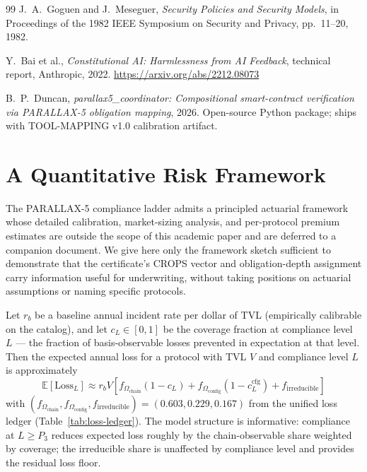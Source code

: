 \documentclass[11pt,a4paper]{article}
\begin{document}
\begin{thebibliography}{99}
J.~A.\ Goguen and J.~Meseguer,
\emph{Security Policies and Security Models}, in Proceedings of the 1982 IEEE Symposium on Security and Privacy, pp.~11--20, 1982.

Y.~Bai et al.,
\emph{Constitutional AI: Harmlessness from AI Feedback}, technical report, Anthropic, 2022.
\url{https://arxiv.org/abs/2212.08073}


B.~P.\ Duncan,
\emph{parallax5\_coordinator: Compositional smart-contract verification via PARALLAX-5 obligation mapping}, 2026.
Open-source Python package; ships with TOOL-MAPPING v1.0 calibration artifact.

\end{thebibliography}

\appendix

\clearpage

\section{A Quantitative Risk Framework}\label{sec:economics}

The PARALLAX-5 compliance ladder admits a principled actuarial framework whose detailed calibration, market-sizing analysis, and per-protocol premium estimates are outside the scope of this academic paper and are deferred to a companion document. We give here only the framework sketch sufficient to demonstrate that the certificate's CROPS vector and obligation-depth assignment carry information useful for underwriting, without taking positions on actuarial assumptions or naming specific protocols.

Let $r_b$ be a baseline annual incident rate per dollar of TVL (empirically calibrable on the catalog), and let $c_L \in [0, 1]$ be the coverage fraction at compliance level $L$ — the fraction of basis-observable losses prevented in expectation at that level. Then the expected annual loss for a protocol with TVL $V$ and compliance level $L$ is approximately
\begin{equation*}
\mathbb{E}[\mathrm{Loss}_L] \approx r_b V \left[ f_{\Omega_{\mathrm{chain}}}(1 - c_L) + f_{\Omega_{\mathrm{config}}}(1 - c_L^{\mathrm{cfg}}) + f_{\mathrm{irreducible}} \right]
\end{equation*}
with $(f_{\Omega_{\mathrm{chain}}}, f_{\Omega_{\mathrm{config}}}, f_{\mathrm{irreducible}}) = (0.603, 0.229, 0.167)$ from the unified loss ledger (Table~\ref{tab:loss-ledger}). The model structure is informative: compliance at $L \geq P_3$ reduces expected loss roughly by the chain-observable share weighted by coverage; the irreducible share is unaffected by compliance level and provides the residual loss floor.
\end{document}
